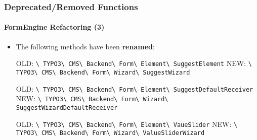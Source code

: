 \begin{frame}[fragile]
	\frametitle{Deprecated/Removed Functions}
	\framesubtitle{FormEngine Refactoring (3)}

	\begin{itemize}

		\item The following methods have been \textbf{renamed}:\newline

			\smaller
				OLD:\tabto{0.8cm}
					\texttt{\textbackslash
						TYPO3\textbackslash
						CMS\textbackslash
						Backend\textbackslash
						Form\textbackslash
						Element\textbackslash
						SuggestElement}\newline
				NEW:\tabto{0.8cm}
					\texttt{\textbackslash
						TYPO3\textbackslash
						CMS\textbackslash
						Backend\textbackslash
						Form\textbackslash
						Wizard\textbackslash
						SuggestWizard}\newline

				OLD:\tabto{0.8cm}
					\texttt{\textbackslash
						TYPO3\textbackslash
						CMS\textbackslash
						Backend\textbackslash
						Form\textbackslash
						Element\textbackslash
						SuggestDefaultReceiver}\newline
				NEW:\tabto{0.8cm}
					\texttt{\textbackslash
						TYPO3\textbackslash
						CMS\textbackslash
						Backend\textbackslash
						Form\textbackslash
						Wizard\textbackslash
						SuggestWizardDefaultReceiver}\newline

				OLD:\tabto{0.8cm}
					\texttt{\textbackslash
						TYPO3\textbackslash
						CMS\textbackslash
						Backend\textbackslash
						Form\textbackslash
						Element\textbackslash
						VaueSlider}\newline
				NEW:\tabto{0.8cm}
					\texttt{\textbackslash
						TYPO3\textbackslash
						CMS\textbackslash
						Backend\textbackslash
						Form\textbackslash
						Wizard\textbackslash
						ValueSliderWizard}\newline

			\normalsize

	\end{itemize}

\end{frame}

